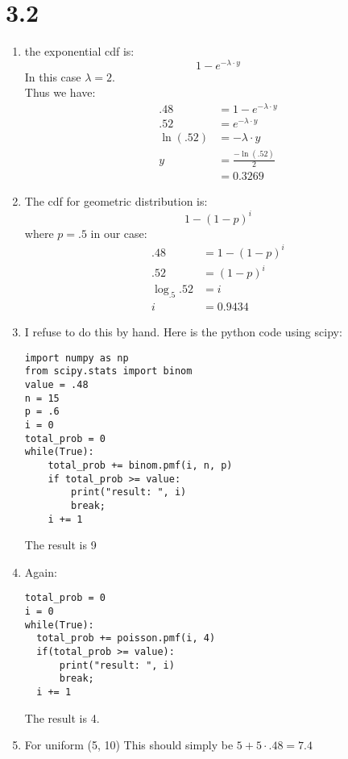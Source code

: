 \documentclass{article}
\begin{document}
\section*{3.2}
\begin{enumerate}
\item the exponential cdf is: \\
\[
1 - e^{-\lambda \cdot y}
\]
In this case $\lambda = 2$. \\
Thus we have: \\
\begin{align*}
.48 &= 1 - e^{-\lambda \cdot y} \\
.52 &= e^{-\lambda \cdot y} \\
\ln(.52) &= -\lambda \cdot y \\
y &= \frac{-\ln(.52)}{2} \\
&= 0.3269
\end{align*}
\item The cdf for geometric distribution is:\\
\[
1 - (1 - p)^{i}
\]
where $p=.5$ in our case:\\
\begin{align*}
.48 &= 1 - (1 - p)^{i} \\
.52 &= (1 - p)^i \\
\log_{.5}.52 &= i\\
i &= 0.9434
\end{align*}
\item I refuse to do this by hand. Here is the python code using scipy: \\
\begin{verbatim}
import numpy as np
from scipy.stats import binom
value = .48
n = 15
p = .6
i = 0
total_prob = 0
while(True):
    total_prob += binom.pmf(i, n, p)
    if total_prob >= value:
        print("result: ", i)
        break;
    i += 1
\end{verbatim}
The result is 9 \\
\item Again: \\
\begin{verbatim}
total_prob = 0
i = 0
while(True):
  total_prob += poisson.pmf(i, 4)
  if(total_prob >= value):
      print("result: ", i)
      break;
  i += 1
\end{verbatim}
The result is 4. \\
\item For uniform (5, 10) This should simply be $5 + 5 \cdot .48 = 7.4$
\end{enumerate}
\end{document}
